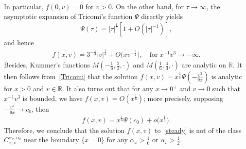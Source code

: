 \documentclass[AHL,Unicode,longabstracts,published]{cedram}
\newcommand*\R {\mathbb{R}}
\begin{document}
In particular, $f(0,v)=0$ for $v>0$. On the other hand, for $\tau\rightarrow\infty$, the asymptotic expansion of Tricomi's function $\Psi$ directly yields
\begin{align*}
\Psi(\tau)=|\tau|^\frac{1}{6}\left[1+O\!\left(|\tau|^{-1}\right)\right],
\end{align*}
and hence
\begin{align*}
f(x,v)= 3^{-\frac{1}{3}}|v|^\frac{1}{2} +O\big(xv^{-\frac{5}{2}}\big),\quad\text{for}\; x^{-1}{v^3}\rightarrow-\infty.
\end{align*}
Besides, Kummer's functions $M(-\frac{1}{6},\frac{2}{3},\cdot)$ and $M(\frac{1}{6},\frac{4}{3},\cdot)$ are analytic on $\R$. It then follows from~\eqref{Tricomi} that the solution $f(x,v)=x^\frac{1}{6}\Psi(-\frac{v^3}{9x})$ is analytic for $x>0$ and $v\in\R$. It also turns out that for any $x\rightarrow0^+$ and $v\rightarrow0$ such that $x^{-1}{v^3}$ is bounded, we have $f(x,v)=O(x^\frac{1}{6})$; more precisely, supposing $-\frac{v^3}{9x}\rightarrow c_0$, then
\begin{align*}
f(x,v)= x^\frac{1}{6}\Psi(c_0)+o\big(x^\frac{1}{6}\big).
\end{align*}
Therefore, we conclude that the solution $f(x,v)$ to~\eqref{steady} is not of the class $C^{\alpha_x,\alpha_v}_{x,v}$ near the boundary $\{x=0\}$ for any $\alpha_x>\frac{1}{6}$ or $\alpha_v>\frac{1}{2}$.



\end{document}
